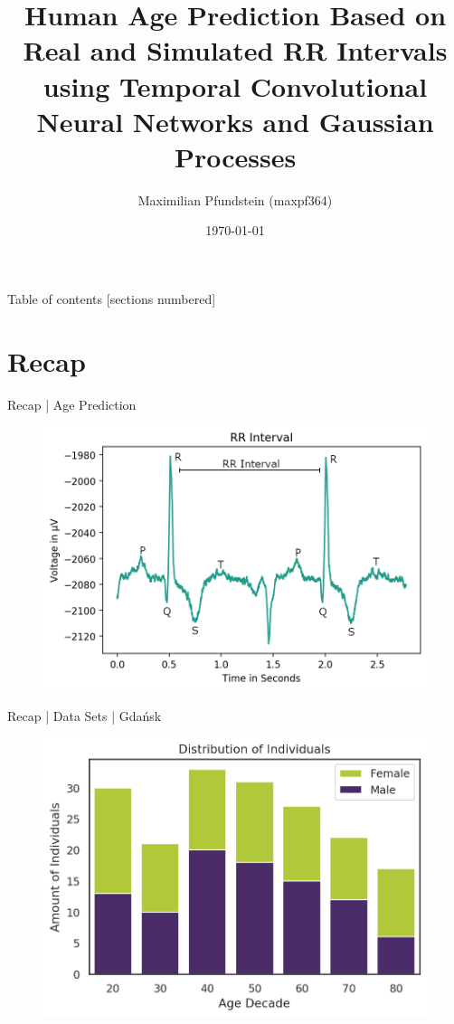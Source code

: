 \documentclass{beamer}
\title{Human Age Prediction Based on Real and Simulated RR Intervals using Temporal Convolutional Neural Networks and Gaussian Processes}
\date{\today}
\author{Maximilian Pfundstein (maxpf364)}
\institute{Linköpings University}
\begin{document}
    \maketitle
    
    \begin{frame}{Table of contents}
      [sections numbered]
      \tableofcontents%
    \end{frame}
    
    \section{Recap}
    \begin{frame}{Recap | Age Prediction}
        \begin{figure}[hbt]
        	\center
        	\includegraphics[width=1.0\textwidth]{img/rr-interval.png}
        	\label{fig:rr}
        \end{figure}
    \end{frame}
    
    \begin{frame}{Recap | Data Sets | Gdańsk}
        \begin{figure}[hbt]
        	\center
        	\includegraphics[width=1.0\textwidth]{img/gdansk-distribution-subjects.png}
        	\label{fig:dist_gdansk}
        \end{figure}
    \end{frame}
    
\end{document}
